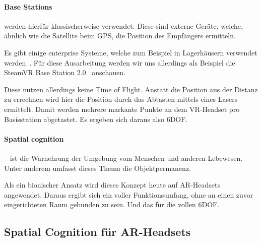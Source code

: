 \paragraph{Base Stations}\label{par:base-stations} werden hierfür klassischerweise verwendet.
Diese sind externe Geräte, welche, ähnlich wie die Satellite beim GPS, die Position des Empfängers ermitteln.

Es gibt einige enterprise Systeme, welche zum Beispiel in Lagerhäusern verwendet werden~\autocite{wikipedia-contributors-2023D}.
Für diese Ausarbeitung werden wir uns allerdings als Beispiel die SteamVR Base Station 2.0~\autocite{unknown-author-no-date} anschauen.

Diese nutzen allerdings keine Time of Flight.
Anstatt die Position aus der Distanz zu errechnen wird hier die Position durch das Abtasten mittels eines Lasers ermittelt.
Damit werden mehrere markante Punkte an dem VR-Headset pro Basisstation abgetastet.
Es ergeben sich daraus also 6DOF\@.

\paragraph{Spatial cognition}~\autocite{wikipedia-contributors-2023E} ist die Warnehrung der Umgebung vom Menschen und anderen Lebewesen.
Unter anderem umfasst dieses Thema die Objektpermanenz.

Als ein bionischer Ansatz wird dieses Konzept heute auf AR-Headsets angewendet.
Daraus ergibt sich ein voller Funktionsumfang, ohne an einen zuvor eingerichteten Raum gebunden zu sein.
Und das für die vollen 6DOF\@.

\subsection{Spatial Cognition für AR-Headsets}\label{subsec:spatial-cognition-fur-ar-headsets}

